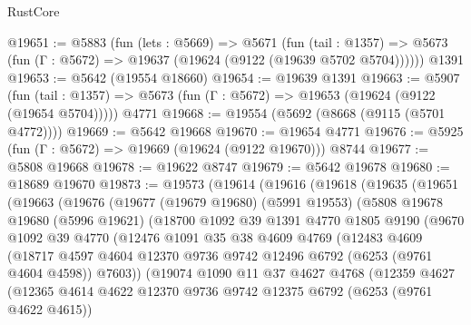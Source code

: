 \begin{lexlean}{RustCore}
\begin{coremodule}
@19651 := @5883
    (fun (lets : @5669) =>
    @5671
      (fun (tail : @1357) =>
      @5673 (fun (Γ : @5672) => @19637 (@19624 (@9122 (@19639 @5702 @5704))))))
    @1391
@19653 := @5642 (@19554 @18660)
@19654 := @19639 @1391
@19663 := @5907
    (fun (tail : @1357) => @5673 (fun (Γ : @5672) => @19653 (@19624 (@9122 (@19654 @5704)))))
    @4771
@19668 := @19554 (@5692 (@8668 (@9115 (@5701 @4772))))
@19669 := @5642 @19668
@19670 := @19654 @4771
@19676 := @5925 (fun (Γ : @5672) => @19669 (@19624 (@9122 @19670))) @8744
@19677 := @5808 @19668
@19678 := @19622 @8747
@19679 := @5642 @19678
@19680 := @18689 @19670
@19873 := @19573
    (@19614
      (@19616
        (@19618
          (@19635
            (@19651
              (@19663
                (@19676
                  (@19677
                    (@19679 @19680)
                    (@5991 @19553)
                    (@5808
                      @19678
                      @19680
                      (@5996 @19621)
                      (@18700
                        @1092
                        @39
                        @1391
                        @4770
                        @1805
                        @9190
                        (@9670
                          @1092
                          @39
                          @4770
                          (@12476
                            @1091
                            @35
                            @38
                            @4609
                            @4769
                            (@12483
                              @4609
                              (@18717
                                @4597
                                @4604
                                @12370
                                @9736
                                @9742
                                @12496
                                @6792
                                (@6253 (@9761 @4604 @4598))
                                @7603))
                            (@19074
                              @1090
                              @11
                              @37
                              @4627
                              @4768
                              (@12359
                                @4627
                                (@12365
                                  @4614
                                  @4622
                                  @12370
                                  @9736
                                  @9742
                                  @12375
                                  @6792
                                  (@6253 (@9761 @4622 @4615))

\end{coremodule}
\end{lexlean}
